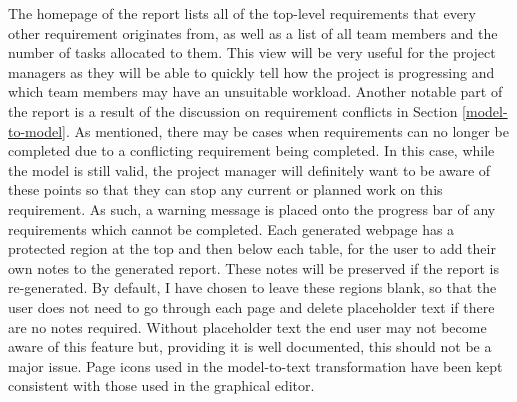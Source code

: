 \documentclass{article}
\begin{document}
The homepage of the report lists all of the top-level requirements that every other requirement originates from, as well as a list of all team members and the number of tasks allocated to them. This view will be very useful for the project managers as they will be able to quickly tell how the project is progressing and which team members may have an unsuitable workload. Another notable part of the report is a result of the discussion on requirement conflicts in Section \ref{model-to-model}. As mentioned, there may be cases when requirements can no longer be completed due to a conflicting requirement being completed. In this case, while the model is still valid, the project manager will definitely want to be aware of these points so that they can stop any current or planned work on this requirement. As such, a warning message is placed onto the progress bar of any requirements which cannot be completed. Each generated webpage has a protected region at the top and then below each table, for the user to add their own notes to the generated report. These notes will be preserved if the report is re-generated. By default, I have chosen to leave these regions blank, so that the user does not need to go through each page and delete placeholder text if there are no notes required. Without placeholder text the end user may not become aware of this feature but, providing it is well documented, this should not be a major issue. Page icons used in the model-to-text transformation have been kept consistent with those used in the graphical editor.
\end{document}
